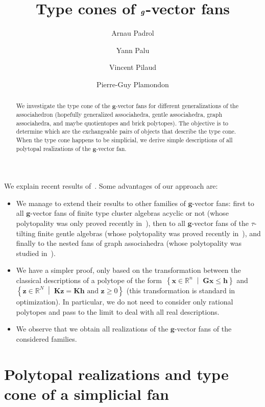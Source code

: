 \documentclass{amsart}
\title{Type cones of $\b{g}$-vector fans}
\author{Arnau Padrol}
\author{Yann Palu}
\author{Vincent Pilaud}
\author{Pierre-Guy Plamondon}
\theoremstyle{definition}
\newcommand{\R}{\mathbb{R}} %
\renewcommand{\b}[1]{{\boldsymbol{#1}}} %
\newcommand{\set}[2]{\left\{ #1 \;\middle|\; #2 \right\}} %
\begin{document}
\begin{abstract}
We investigate the type cone of the $\b{g}$-vector fans for different generalizations of the associahedron (hopefully generalized associahedra, gentle associahedra, graph associahedra, and maybe quotientopes and brick polytopes).
The objective is to determine which are the exchangeable pairs of objects that describe the type cone.
When the type cone happens to be simplicial, we derive simple descriptions of all polytopal realizations of the $\b{g}$-vector fan.
\end{abstract}

\maketitle

\tableofcontents

We explain recent results of~\cite{BazierMatteDouvilleMousavandThomasYildirim}. Some advantages of our approach are:
\begin{itemize}
\item We manage to extend their results to other families of $\b{g}$-vector fans: first to all $\b{g}$-vector fans of finite type cluster algebras acyclic or not (whose polytopality was only proved recently in~\cite{HohlwegPilaudStella}), then to all $\b{g}$-vector fans of the $\tau$-tilting finite gentle algebras (whose polytopality was proved recently in~\cite{PaluPilaudPlamondon-nonkissing}), and finally to the nested fans of graph associahedra (whose polytopality was studied in~\cite{CarrDevadoss, Devadoss, Postnikov, FeichtnerSturmfels, Zelevinsky}).
\item We have a simpler proof, only based on the transformation between the classical descriptions of a polytope of the form~$\set{\b{x} \in \R^n}{\b{G}\b{x} \le \b{h}}$ and~$\set{\b{z} \in \R^N}{\b{K}\b{z} = \b{K}\b{h} \text{ and } \b{z} \ge 0}$ (this transformation is standard in optimization). In particular, we do not need to consider only rational polytopes and pass to the limit to deal with all real descriptions.
\item We observe that we obtain all realizations of the $\b{g}$-vector fans of the considered families.
\end{itemize}


\section{Polytopal realizations and type cone of a simplicial fan}
\end{document}
